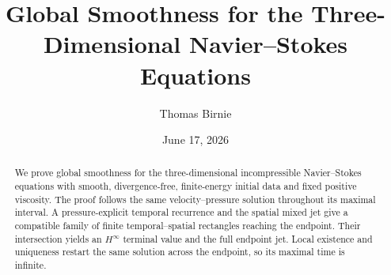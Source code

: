 \documentclass[11pt]{article}
\title{Global Smoothness for the Three-Dimensional Navier--Stokes Equations}
\author{Thomas Birnie}
\date{June 17, 2026}
\begin{document}
\maketitle
\clearpage

\begin{abstract}
We prove global smoothness for the three-dimensional incompressible
Navier--Stokes equations with smooth, divergence-free, finite-energy initial
data and fixed positive viscosity.  The proof follows the same
velocity--pressure solution throughout its maximal interval.  A
pressure-explicit temporal recurrence and the spatial mixed jet give a
compatible family of finite temporal--spatial rectangles reaching the
endpoint.  Their intersection yields an \(H^\infty\) terminal value and the
full endpoint jet.  Local existence and uniqueness restart the same solution
across the endpoint, so its maximal time is infinite.
\end{abstract}
\clearpage

\tableofcontents
\clearpage


\end{document}
